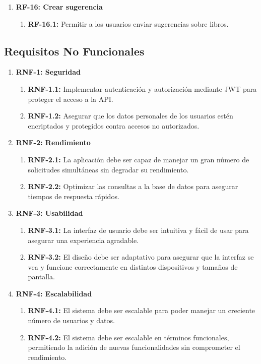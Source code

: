 \begin{enumerate}
    \item \textbf{RF-16: Crear sugerencia}
    \begin{enumerate}
        \item \textbf{RF-16.1:} Permitir a los usuarios enviar sugerencias sobre libros.
    \end{enumerate}
    
\end{enumerate}

\subsection{Requisitos No Funcionales}

\begin{enumerate}
    \item \textbf{RNF-1: Seguridad}
    \begin{enumerate}
        \item \textbf{RNF-1.1:} Implementar autenticación y autorización mediante JWT para proteger el acceso a la API.
        \item \textbf{RNF-1.2:} Asegurar que los datos personales de los usuarios estén encriptados y protegidos contra accesos no autorizados.
    \end{enumerate}

    \item \textbf{RNF-2: Rendimiento}
    \begin{enumerate}
        \item \textbf{RNF-2.1:} La aplicación debe ser capaz de manejar un gran número de solicitudes simultáneas sin degradar su rendimiento.
        \item \textbf{RNF-2.2:} Optimizar las consultas a la base de datos para asegurar tiempos de respuesta rápidos.
    \end{enumerate}

    \item \textbf{RNF-3: Usabilidad}
    \begin{enumerate}
        \item \textbf{RNF-3.1:} La interfaz de usuario debe ser intuitiva y fácil de usar para asegurar una experiencia agradable.
        \item \textbf{RNF-3.2:} El diseño debe ser adaptativo para asegurar que la interfaz se vea y funcione correctamente en distintos dispositivos y tamaños de pantalla.
    \end{enumerate}

    \item \textbf{RNF-4: Escalabilidad}
    \begin{enumerate}
        \item \textbf{RNF-4.1:} El sistema debe ser escalable para poder manejar un creciente número de usuarios y datos.
        \item \textbf{RNF-4.2:} El sistema debe ser escalable en términos funcionales, permitiendo la adición de nuevas funcionalidades sin comprometer el rendimiento.
    \end{enumerate}


\end{enumerate}
